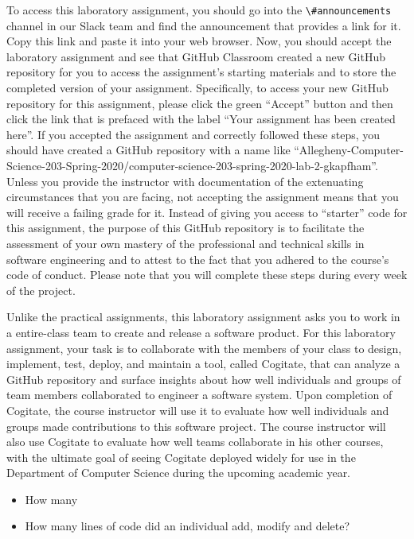 \documentclass[11pt]{article}
\newcommand{\channel}[1]{\lstinline{#1}}
\begin{document}
To access this laboratory assignment, you should go into the
\channel{\#announcements} channel in our Slack team and find the announcement
that provides a link for it. Copy this link and paste it into your web browser.
Now, you should accept the laboratory assignment and see that GitHub Classroom
created a new GitHub repository for you to access the assignment's starting
materials and to store the completed version of your assignment. Specifically,
to access your new GitHub repository for this assignment, please click the green
``Accept'' button and then click the link that is prefaced with the label ``Your
assignment has been created here''. If you accepted the assignment and correctly
followed these steps, you should have created a GitHub repository with a name
like
``Allegheny-Computer-Science-203-Spring-2020/computer-science-203-spring-2020-lab-2-gkapfham''.
Unless you provide the instructor with documentation of the extenuating
circumstances that you are facing, not accepting the assignment means that you
will receive a failing grade for it.
%
Instead of giving you access to ``starter'' code for this assignment, the
purpose of this GitHub repository is to facilitate the assessment of your own
mastery of the professional and technical skills in software engineering and to
attest to the fact that you adhered to the course's code of conduct.
%
Please note that you will complete these steps during every week of the project.


Unlike the practical assignments, this laboratory assignment asks you to work in
a entire-class team to create and release a software product.
%
For this laboratory assignment, your task is to collaborate with the members of
your class to design, implement, test, deploy, and maintain a tool, called
Cogitate, that can analyze a GitHub repository and surface insights about how
well individuals and groups of team members collaborated to engineer a software
system. Upon completion of Cogitate, the course instructor will use it to
evaluate how well individuals and groups made contributions to this software
project. The course instructor will also use Cogitate to evaluate how well teams
collaborate in his other courses, with the ultimate goal of seeing Cogitate
deployed widely for use in the Department of Computer Science during the
upcoming academic year.

\begin{itemize}

  \setlength{\itemsep}{0pt}

  \item How many

  \item How many lines of code did an individual add, modify and delete?

\end{itemize}
\end{document}
